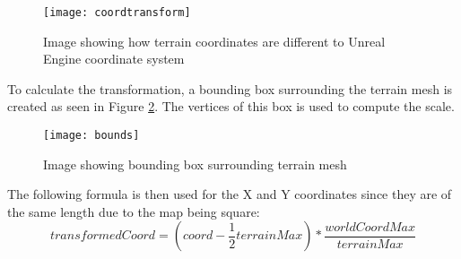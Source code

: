 \begin{figure}[H]
	\texttt{[image: coordtransform]}
	\centering
	\caption{Image showing how terrain coordinates are different to Unreal Engine coordinate system}
	\label{fig:coordinatesystem}
\end{figure}

To calculate the transformation, a bounding box surrounding the terrain mesh is created as seen in Figure \ref{fig:boundingbox}. The vertices of this box is used to compute the scale.
\newline
\par

\begin{figure}[H]
	\texttt{[image: bounds]}
	\centering
	\caption{Image showing bounding box surrounding terrain mesh}
	\label{fig:boundingbox}
\end{figure}

The following formula is then used for the X and Y coordinates since they are of the same length due to the map being square:
\[transformedCoord = (coord - \frac{1}{2}terrainMax) * \frac{worldCoordMax}{terrainMax}\]


